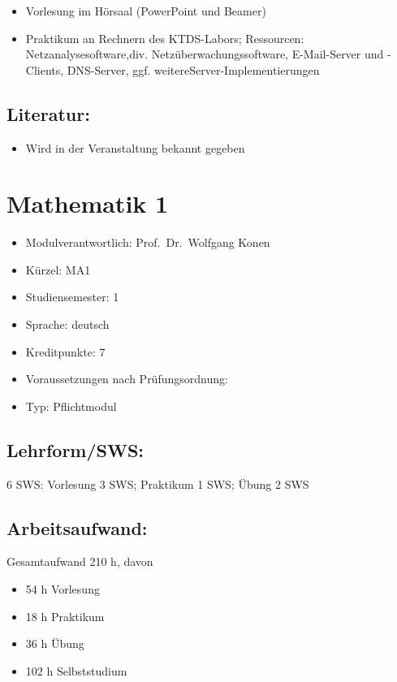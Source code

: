 \begin{itemize}
\tightlist
\item
  Vorlesung im Hörsaal (PowerPoint und Beamer)
\item
  Praktikum an Rechnern des KTDS-Labors; Ressourcen:
  Netzanalysesoftware,div. Netzüberwachungssoftware, E-Mail-Server und
  -Clients, DNS-Server, ggf. weitereServer-Implementierungen
\end{itemize}

\section*{Literatur:}\label{literatur-9}

\begin{itemize}
\tightlist
\item
  Wird in der Veranstaltung bekannt gegeben
\end{itemize}

\chapter{Mathematik 1}\label{mathematik-1}

\begin{itemize}
\tightlist
\item
  Modulverantwortlich: Prof.~Dr.~Wolfgang Konen
\item
  Kürzel: MA1
\item
  Studiensemester: 1
\item
  Sprache: deutsch
\item
  Kreditpunkte: 7
\item
  Voraussetzungen nach Prüfungsordnung: ~
\item
  Typ: Pflichtmodul
\end{itemize}

\section*{Lehrform/SWS:}\label{lehrformsws-13}

6 SWS: Vorlesung 3 SWS; Praktikum 1 SWS; Übung 2 SWS

\section*{Arbeitsaufwand:}\label{arbeitsaufwand-12}

Gesamtaufwand 210 h, davon

\begin{itemize}
\tightlist
\item
  54 h Vorlesung
\item
  18 h Praktikum
\item
  36 h Übung
\item
  102 h Selbststudium
\end{itemize}

